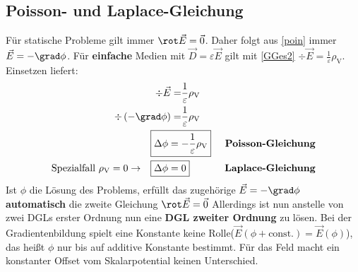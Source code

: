 	  \subsection{Poisson- und Laplace-Gleichung}
 Für statische Probleme gilt immer $\rot \vec{E} = \vec{0}$. Daher folgt aus \ref{poin} immer $\vec{E} = - \grad \phi$. Für \textbf{einfache} Medien mit $\vec{D}  = \varepsilon \vec{E}$ gilt mit \ref{GGes2} $\div \vec{E} =
			        \frac{1}{\varepsilon} \rho_\text{V} $. Einsetzen liefert:
		        \begin{align}
			        \nonumber\div \vec{E} =                                             &
			        \frac{1}{\varepsilon} \rho_\text{V}                                                             \\
			       \nonumber \div \left(-\grad \phi\right) =                            & \frac{1}{\varepsilon}
			        \rho_\text{V}                                                                                   \\
			       \Aboxed{ \Delta \phi =                                              & - \frac{1}{\varepsilon}
			        \rho_\text{V}    }                                          & \textbf{
			        Poisson-Gleichung}                                                                              \\
			        \text{Spezialfall } \rho_\text{V}=0 \to\quad \Aboxed{\Delta \phi = & 0    }                   & \textbf{
				        Laplace-Gleichung}
		        \end{align}
		   Ist $\phi$ die Lösung des Problems, erfüllt
		        das zugehörige $\vec{E} = - \grad \phi$ \textbf{automatisch} die
		        zweite Gleichung $\rot \vec{E} = \vec{0}$
		   Allerdings ist nun anstelle von zwei DGLs erster Ordnung nun
		        eine \textbf{DGL zweiter Ordnung} zu lösen.
		    Bei der Gradientenbildung spielt eine Konstante keine Rolle($\vec{E}(\phi + \text{const.}) =
			        \vec{E}(\phi)$), das heißt $\phi$ nur bis auf additive
		        Konstante bestimmt. Für das Feld macht ein konstanter Offset vom Skalarpotential keinen Unterschied.

